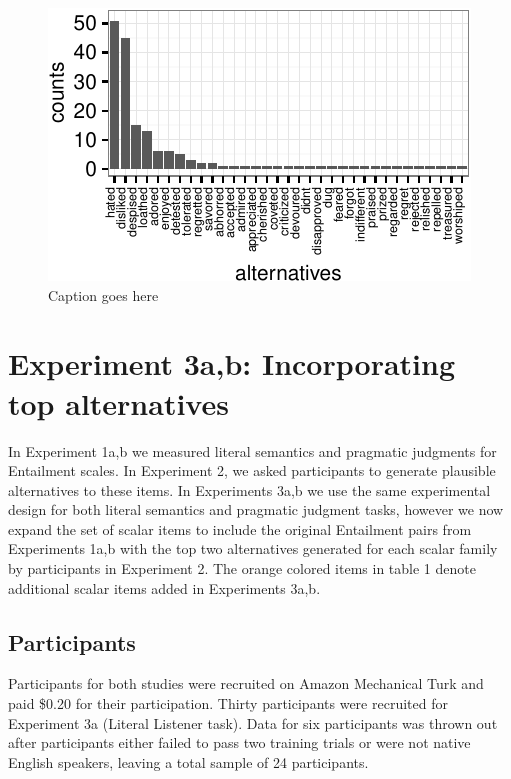 \documentclass[10pt, letterpaper]{article}
\newenvironment{CodeChunk}{}{}
\begin{document}
\begin{CodeChunk}
\begin{figure}[t]

{\centering \includegraphics{figs/exp2_altsPlot_likedLoved-1} 

}

\caption[Caption goes here]{Caption goes here}\label{fig:exp2_altsPlot_likedLoved}
\end{figure}
\end{CodeChunk}

\section{Experiment 3a,b: Incorporating top
alternatives}\label{experiment-3ab-incorporating-top-alternatives}

In Experiment 1a,b we measured literal semantics and pragmatic judgments
for Entailment scales. In Experiment 2, we asked participants to
generate plausible alternatives to these items. In Experiments 3a,b we
use the same experimental design for both literal semantics and
pragmatic judgment tasks, however we now expand the set of scalar items
to include the original Entailment pairs from Experiments 1a,b with the
top two alternatives generated for each scalar family by participants in
Experiment 2. The orange colored items in table 1 denote additional
scalar items added in Experiments 3a,b.

\subsection{Participants}\label{participants-2}

Participants for both studies were recruited on Amazon Mechanical Turk
and paid \$0.20 for their participation. Thirty participants were
recruited for Experiment 3a (Literal Listener task). Data for six
participants was thrown out after participants either failed to pass two
training trials or were not native English speakers, leaving a total
sample of 24 participants.
\end{document}
